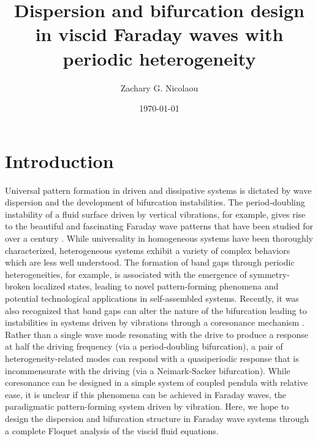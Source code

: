 \documentclass[aps,pre,amsmath,amssymb,floatfix,onecolumn,notitlepage,10pt]{revtex4-1}
\begin{document}
\title{Dispersion and bifurcation design in viscid Faraday waves with periodic heterogeneity}
\author{Zachary G. Nicolaou}
\date{\today}

\maketitle

\section{Introduction}
Universal pattern formation in driven and dissipative systems is dictated by wave dispersion and the development of bifurcation instabilities. The period-doubling instability of a fluid surface driven by vertical vibrations, for example, gives rise to the beautiful and fascinating Faraday wave patterns that have been studied for over a century \cite{2021_Nicolaou_1}. While universality in homogeneous systems have been thoroughly characterized, heterogeneous systems exhibit a variety of complex behaviors which are less well understood. The formation of band gaps through periodic heterogeneities, for example, is associated with the emergence of symmetry-broken localized states, leading to novel pattern-forming phenomena and potential technological applications in self-assembled systems. Recently, it was also recognized that band gaps can alter the nature of the bifurcation leading to instabilities in systems driven by vibrations through a coresonance mechanism \cite{2021_Nicolaou_2}. Rather than a single wave mode resonating with the drive to produce a response at half the driving frequency (via a period-doubling bifurcation), a pair of heterogeneity-related modes can respond with a quasiperiodic response that is incommensurate with the driving (via a Neimark-Sacker bifurcation). While coresonance can be designed in a simple system of coupled pendula with relative ease, it is unclear if this phenomena can be achieved in Faraday waves, the paradigmatic pattern-forming system driven by vibration. Here, we hope to design the dispersion and bifurcation structure in Faraday wave systems through a complete Floquet  analysis of the viscid fluid equations.
\end{document}

